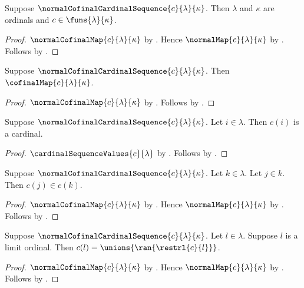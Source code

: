 \begin{proposition}\label{normal_cofinal_cardinal_sequence_type}
    Suppose $\normalCofinalCardinalSequence{c}{\lambda}{\kappa}$.
    Then $\lambda$ and $\kappa$ are ordinals and
        $c\in\funs{\lambda}{\kappa}$.
\end{proposition}
\begin{proof}
    $\normalCofinalMap{c}{\lambda}{\kappa}$
        by .
    Hence $\normalMap{c}{\lambda}{\kappa}$
        by .
    Follows by .
\end{proof}

\begin{proposition}\label{normal_cofinal_cardinal_sequence_is_cofinal}
    Suppose $\normalCofinalCardinalSequence{c}{\lambda}{\kappa}$.
    Then $\cofinalMap{c}{\lambda}{\kappa}$.
\end{proposition}
\begin{proof}
    $\normalCofinalMap{c}{\lambda}{\kappa}$
        by .
    Follows by .
\end{proof}

\begin{proposition}\label{normal_cofinal_cardinal_sequence_value}
    Suppose $\normalCofinalCardinalSequence{c}{\lambda}{\kappa}$.
    Let $i\in\lambda$.
    Then $c(i)$ is a cardinal.
\end{proposition}
\begin{proof}
    $\cardinalSequenceValues{c}{\lambda}$
        by .
    Follows by .
\end{proof}

\begin{proposition}\label{normal_cofinal_cardinal_sequence_increasing}
    Suppose $\normalCofinalCardinalSequence{c}{\lambda}{\kappa}$.
    Let $k\in\lambda$.
    Let $j\in k$.
    Then $c(j)\in c(k)$.
\end{proposition}
\begin{proof}
    $\normalCofinalMap{c}{\lambda}{\kappa}$
        by .
    Hence $\normalMap{c}{\lambda}{\kappa}$
        by .
    Follows by .
\end{proof}

\begin{proposition}\label{normal_cofinal_cardinal_sequence_continuous}
    Suppose $\normalCofinalCardinalSequence{c}{\lambda}{\kappa}$.
    Let $l\in\lambda$.
    Suppose $l$ is a limit ordinal.
    Then $c(l)=\unions{\ran{\restrl{c}{l}}}$.
\end{proposition}
\begin{proof}
    $\normalCofinalMap{c}{\lambda}{\kappa}$
        by .
    Hence $\normalMap{c}{\lambda}{\kappa}$
        by .
    Follows by .
\end{proof}

